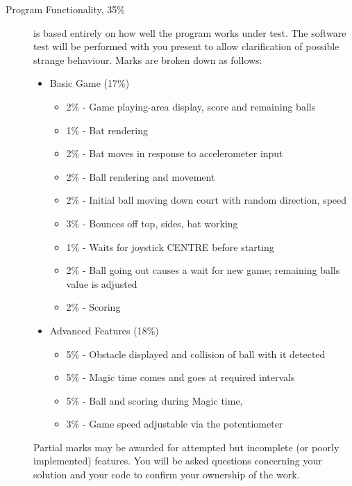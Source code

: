 \documentclass[a4paper]{article}
\begin{document}
{\begin{description}
\item [Program Functionality, 35\%] is based entirely on how well the
  program works under test.  The software test will be performed with
  you present to allow clarification of possible strange
  behaviour. Marks are broken down as follows:
\begin{itemize}
\item Basic Game (17\%)
  \begin{itemize}
  \item 2\% - Game playing-area display, score and remaining balls
  \item 1\% - Bat rendering
  \item 2\% - Bat moves in response to accelerometer input
  \item 2\% - Ball rendering and movement
  \item 2\% - Initial ball moving down court with random direction,
    speed
  \item 3\% - Bounces off top, sides, bat working
  \item 1\% - Waits for joystick CENTRE before starting
  \item 2\% - Ball going out causes a wait for new game; remaining
    balls value is adjusted
  \item 2\% - Scoring 
  \end{itemize}
\item Advanced Features (18\%)
  \begin{itemize}
  \item 5\% - Obstacle displayed and collision of ball with it
    detected
  \item 5\% - Magic time comes and goes at required intervals
  \item 5\% - Ball and scoring during Magic time, 
  \item 3\% - Game speed adjustable via the potentiometer
  \end{itemize}
\end{itemize}
Partial marks may be awarded for attempted but incomplete (or poorly
implemented) features. You will be asked questions concerning your
solution and your code to confirm your ownership of the work.


\end{description}}
\end{document}
